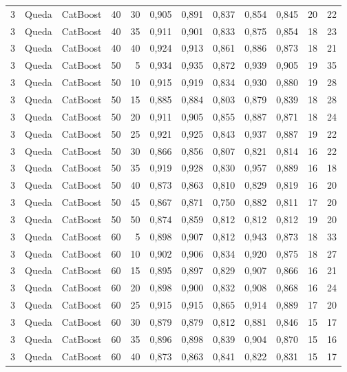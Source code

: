 \begin{longtable}{@{}rllrrrrrrrrr@{}}
3 & Queda & CatBoost & 40 & 30 & 0,905 & 0,891 & 0,837 & 0,854 & 0,845 & 20 & 22 \\
3 & Queda & CatBoost & 40 & 35 & 0,911 & 0,901 & 0,833 & 0,875 & 0,854 & 18 & 23 \\
3 & Queda & CatBoost & 40 & 40 & 0,924 & 0,913 & 0,861 & 0,886 & 0,873 & 18 & 21 \\
3 & Queda & CatBoost & 50 & 5 & 0,934 & 0,935 & 0,872 & 0,939 & 0,905 & 19 & 35 \\
3 & Queda & CatBoost & 50 & 10 & 0,915 & 0,919 & 0,834 & 0,930 & 0,880 & 19 & 28 \\
3 & Queda & CatBoost & 50 & 15 & 0,885 & 0,884 & 0,803 & 0,879 & 0,839 & 18 & 28 \\
3 & Queda & CatBoost & 50 & 20 & 0,911 & 0,905 & 0,855 & 0,887 & 0,871 & 18 & 24 \\
3 & Queda & CatBoost & 50 & 25 & 0,921 & 0,925 & 0,843 & 0,937 & 0,887 & 19 & 22 \\
3 & Queda & CatBoost & 50 & 30 & 0,866 & 0,856 & 0,807 & 0,821 & 0,814 & 16 & 22 \\
3 & Queda & CatBoost & 50 & 35 & 0,919 & 0,928 & 0,830 & 0,957 & 0,889 & 16 & 18 \\
3 & Queda & CatBoost & 50 & 40 & 0,873 & 0,863 & 0,810 & 0,829 & 0,819 & 16 & 20 \\
3 & Queda & CatBoost & 50 & 45 & 0,867 & 0,871 & 0,750 & 0,882 & 0,811 & 17 & 20 \\
3 & Queda & CatBoost & 50 & 50 & 0,874 & 0,859 & 0,812 & 0,812 & 0,812 & 19 & 20 \\
3 & Queda & CatBoost & 60 & 5 & 0,898 & 0,907 & 0,812 & 0,943 & 0,873 & 18 & 33 \\
3 & Queda & CatBoost & 60 & 10 & 0,902 & 0,906 & 0,834 & 0,920 & 0,875 & 18 & 27 \\
3 & Queda & CatBoost & 60 & 15 & 0,895 & 0,897 & 0,829 & 0,907 & 0,866 & 16 & 21 \\
3 & Queda & CatBoost & 60 & 20 & 0,898 & 0,900 & 0,832 & 0,908 & 0,868 & 16 & 24 \\
3 & Queda & CatBoost & 60 & 25 & 0,915 & 0,915 & 0,865 & 0,914 & 0,889 & 17 & 20 \\
3 & Queda & CatBoost & 60 & 30 & 0,879 & 0,879 & 0,812 & 0,881 & 0,846 & 15 & 17 \\
3 & Queda & CatBoost & 60 & 35 & 0,896 & 0,898 & 0,839 & 0,904 & 0,870 & 15 & 16 \\
3 & Queda & CatBoost & 60 & 40 & 0,873 & 0,863 & 0,841 & 0,822 & 0,831 & 15 & 17 \\

\end{longtable}
